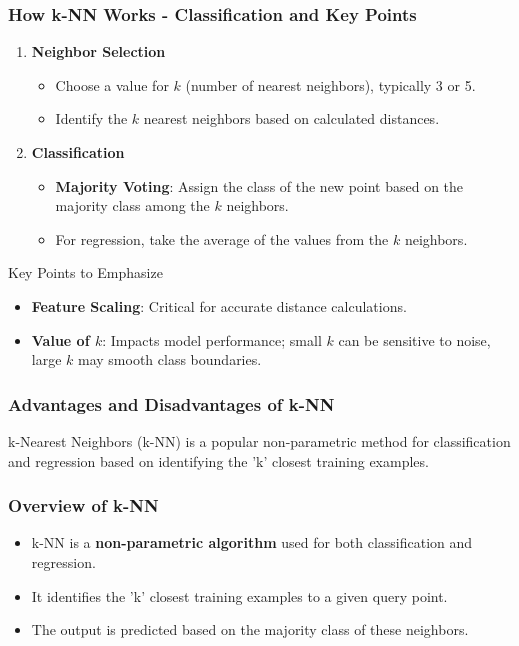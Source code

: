 \documentclass[aspectratio=169]{beamer}
\begin{document}
\begin{frame}[fragile]
    \frametitle{How k-NN Works - Classification and Key Points}
    \begin{enumerate}[resume]
        \item \textbf{Neighbor Selection}
            \begin{itemize}
                \item Choose a value for \(k\) (number of nearest neighbors), typically 3 or 5.
                \item Identify the \(k\) nearest neighbors based on calculated distances.
            \end{itemize}
        
        \item \textbf{Classification}
            \begin{itemize}
                \item \textbf{Majority Voting}: Assign the class of the new point based on the majority class among the \(k\) neighbors.
                \item For regression, take the average of the values from the \(k\) neighbors.
            \end{itemize}
    \end{enumerate}
    \begin{block}{Key Points to Emphasize}
        \begin{itemize}
            \item \textbf{Feature Scaling}: Critical for accurate distance calculations.
            \item \textbf{Value of \(k\)}: Impacts model performance; small \(k\) can be sensitive to noise, large \(k\) may smooth class boundaries.
        \end{itemize}
    \end{block}
\end{frame}

\begin{frame}[fragile]
    \frametitle{Advantages and Disadvantages of k-NN}
    k-Nearest Neighbors (k-NN) is a popular non-parametric method for classification and regression based on identifying the 'k' closest training examples. 
\end{frame}

\begin{frame}[fragile]
    \frametitle{Overview of k-NN}
    \begin{itemize}
        \item k-NN is a \textbf{non-parametric algorithm} used for both classification and regression.
        \item It identifies the 'k' closest training examples to a given query point.
        \item The output is predicted based on the majority class of these neighbors.
    \end{itemize}
\end{frame}
\end{document}
